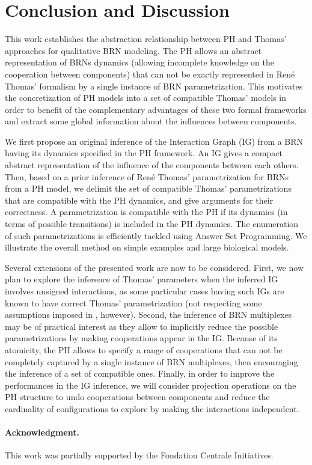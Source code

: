 \section{Conclusion and Discussion}

This work establishes the abstraction relationship between PH and Thomas' approaches for
qualitative BRN modeling.
The PH allows an abstract representation of BRNs dynamics (allowing incomplete knowledge on the
cooperation between components) that can not be exactly represented in Ren\'e Thomas' formalism by a
single instance of BRN parametrization.
This motivates the concretization of PH models into a set of compatible Thomas' models in order to benefit
of the complementary advantages of these two formal frameworks and extract some global information about
the influences between components.

We first propose an original inference of the Interaction Graph (IG) from a BRN
having its dynamics specified in the PH framework.
An IG gives a compact abstract representation of the influence of the components between each
others.
Then, based on a prior inference of Ren\'e Thomas' parametrization for BRNs from a PH model, we
delimit the set of compatible Thomas' parametrizations that are compatible with the PH dynamics,
and give arguments for their correctness.
A parametrization is compatible with the PH if its dynamics (in terms of possible transitions) is included in the PH dynamics.
The enumeration of such parametrizations is efficiently tackled using Answer Set Programming.
We illustrate the overall method on simple examples and large biological models.

Several extensions of the presented work are now to be considered.
First, we now plan to explore the inference of Thomas' parameters when the inferred IG involves unsigned interactions, as some particular cases having such IGs are known to have correct
Thomas' parametrization (not respecting some assumptions imposed in ,
however).
Second, the inference of BRN multiplexes \cite{BernotMultiplexes} may be of practical interest 
as they allow to implicitly reduce the possible parametrizations by making cooperations appear
in the IG.
Because of its atomicity, the PH allows to specify a range of cooperations that can not be
completely captured by a single instance of BRN multiplexes, then encouraging the inference of a set
of compatible ones.
Finally, in order to improve the performances in the IG inference, we will consider projection operations on
the PH structure to undo cooperations between components and reduce the cardinality of
configurations to explore by making the interactions independent.

\paragraph{Acknowledgment.}
This work was partially supported by the Fondation Centrale Initiatives.
